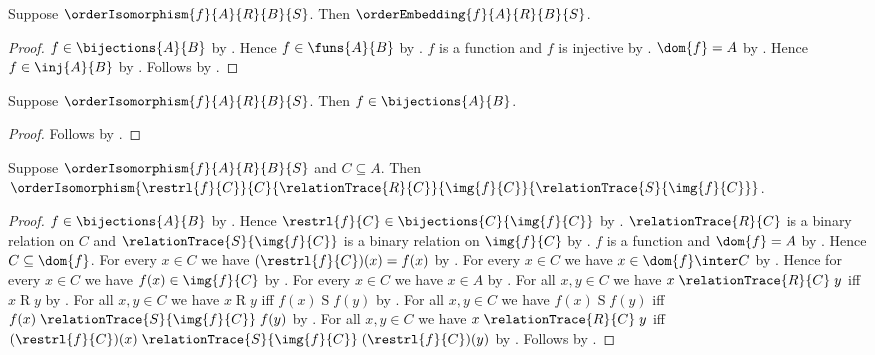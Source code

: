 \begin{proposition}\label{order_isomorphism_is_embedding}
    Suppose $\orderIsomorphism{f}{A}{R}{B}{S}$.
    Then $\orderEmbedding{f}{A}{R}{B}{S}$.
\end{proposition}
\begin{proof}
    $f\in\bijections{A}{B}$ by .
    Hence $f\in\funs{A}{B}$ by .
    $f$ is a function and $f$ is injective by
        .
    $\dom{f}=A$ by .
    Hence $f\in\inj{A}{B}$ by .
    Follows by .
\end{proof}

\begin{proposition}\label{order_isomorphism_type}
    Suppose $\orderIsomorphism{f}{A}{R}{B}{S}$.
    Then $f\in\bijections{A}{B}$.
\end{proposition}
\begin{proof}
    Follows by .
\end{proof}

\begin{proposition}\label{order_isomorphism_restriction_to_image}
    Suppose $\orderIsomorphism{f}{A}{R}{B}{S}$ and $C\subseteq A$.
    Then
        $\orderIsomorphism{\restrl{f}{C}}
            {C}{\relationTrace{R}{C}}
            {\img{f}{C}}{\relationTrace{S}{\img{f}{C}}}$.
\end{proposition}
\begin{proof}
    $f\in\bijections{A}{B}$ by .
    Hence $\restrl{f}{C}\in\bijections{C}{\img{f}{C}}$ by
        .
    $\relationTrace{R}{C}$ is a binary relation on $C$ and
        $\relationTrace{S}{\img{f}{C}}$ is a binary relation on
            $\img{f}{C}$ by
        .
    $f$ is a function and $\dom{f}=A$ by
        .
    Hence $C\subseteq\dom{f}$.
    For every $x\in C$ we have
        $(\restrl{f}{C})(x)=f(x)$ by
        .
    For every $x\in C$ we have $x\in\dom{f}\inter C$ by
        .
    Hence for every $x\in C$ we have $f(x)\in\img{f}{C}$ by
        .
    For every $x\in C$ we have $x\in A$ by .
    For all $x,y\in C$ we have
        $x\mathrel{\relationTrace{R}{C}}y$ iff
        $x\mathrel{R}y$ by .
    For all $x,y\in C$ we have
        $x\mathrel{R}y$ iff $f(x)\mathrel{S}f(y)$ by
        .
    For all $x,y\in C$ we have
        $f(x)\mathrel{S}f(y)$ iff
        $f(x)\mathrel{\relationTrace{S}{\img{f}{C}}}f(y)$ by
        .
    For all $x,y\in C$ we have
        $x\mathrel{\relationTrace{R}{C}}y$ iff
        $(\restrl{f}{C})(x)
            \mathrel{\relationTrace{S}{\img{f}{C}}}
            (\restrl{f}{C})(y)$ by
        \auto.
    Follows by .
\end{proof}

